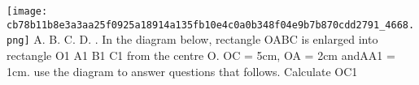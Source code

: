\documentclass{article}
\begin{document}
\begin{multicols}{2}
  \texttt{[image: cb78b11b8e3a3aa25f0925a18914a135fb10e4c0a0b348f04e9b7b870cdd2791\_4668.png]}
 \newline \indent A. \newline \indent B. \newline \indent C. \newline \indent D.  \newline{}.  In the diagram below, rectangle OABC is enlarged into rectangle O1 A1 B1 C1 from the centre O. OC = 5cm, OA = 2cm andAA1 = 1cm. use the diagram to answer questions that follows.
Calculate OC1\newline
  

\end{multicols}
\end{document}
